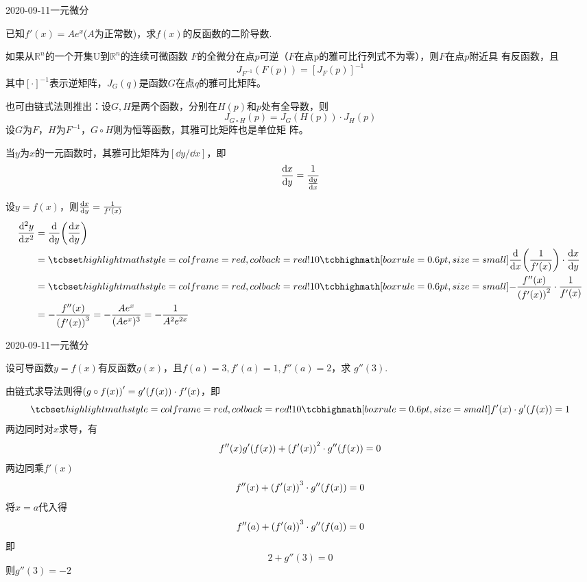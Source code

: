 \documentclass{ctexart}
\begin{document}
\begin{mathques}{2020-09-11}{一元微分}
\begin{ques}
  已知$f'(x) = Ae^x$($A$为正常数)，求$f(x)$的反函数的二阶导数.
\end{ques}
\begin{solu}
  \begin{mathideabox}[反函数定理]
    如果从$\mathbb{R}^n$的一个开集$\mathrm{U}$到$\mathbb{R}^n$的连续可微函数
    $F$的全微分在点$p$可逆（$F$在点p的雅可比行列式不为零），则$F$在点$p$附近具
    有反函数，且
    \[
      J_{F^{-1}}(F(p)) = [J_F(p)]^{-1}
    \]
    其中$[\cdot]^{-1}$表示逆矩阵，$J_G(q)$是函数$G$在点$q$的雅可比矩阵。

    也可由链式法则推出：设$G,H$是两个函数，分别在$H(p)$和$p$处有全导数，则
    \[
      J_{G\circ H}(p) = J_G(H(p))\cdot J_H(p)
    \]
    设$G$为$F$，$H$为$F^{-1}$，$G\circ H$则为恒等函数，其雅可比矩阵也是单位矩
    阵。

    当$y$为$x$的一元函数时，其雅可比矩阵为$[\dd y / \dd x]$，即
    \[
      \dv{x}{y} = \frac{1}{\dv{y}{x}}
    \]
  \end{mathideabox}
  设$y = f(x)$，则$\dv{x}{y} = \frac{1}{f'(x)}$
  \begin{align*}
    \dv[2]{y}{x} &= \dv{y}(\dv{x}{y})\\
    &= \matherror{\dv{x}(\frac{1}{f'(x)}) \cdot \dv{x}{y}}\\
    &= \matherror{-\frac{f''(x)}{\qty(f'(x))^2} \cdot \frac{1}{f'(x)}}\\
    &= -\frac{f''(x)}{\qty(f'(x))^3} = - \frac{Ae^x}{(Ae^x)^3} = -\frac{1}
    {A^2e^{2x}}
  \end{align*}
\end{solu}
\end{mathques}

\begin{mathques}{2020-09-11}{一元微分}
\begin{ques}
  设可导函数$y = f(x)$有反函数$g(x)$，且$f(a) = 3, f'(a) = 1, f''(a) = 2$，求
  $g''(3)$.
\end{ques}
\begin{solu}
  由链式求导法则得$\qty(g \circ f(x))' = g'\qty(f(x)) \cdot f'(x)$，即
  \[
    \matherror{f'(x) \cdot g'(f(x)) = 1}
  \]
  两边同时对$x$求导，有
  \[
    f''(x)g'(f(x)) + \qty(f'(x))^2 \cdot g''(f(x)) = 0
  \]
  两边同乘$f'(x)$
  \[
    f''(x) + \qty(f'(x))^3 \cdot g''(f(x)) = 0
  \]
  将$x = a$代入得
  \[
    f''(a) + \qty(f'(a))^3 \cdot g''(f(a)) = 0
  \]
  即
  \[
    2 + g''(3) = 0
  \]
  则$g''(3) = -2$
\end{solu}
\end{mathques}
\end{document}
